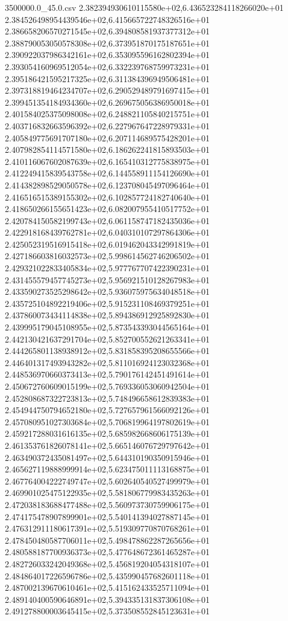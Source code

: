 \begin{filecontents*}{3500000.0_45.0.csv}
2.382394930610115580e+02,6.436523284118266020e+01
2.384526498954439546e+02,6.415665722748326516e+01
2.386658206570271545e+02,6.394808581937377312e+01
2.388790053050578308e+02,6.373951870175187651e+01
2.390922037986342161e+02,6.353095596162802394e+01
2.393054160969512054e+02,6.332239768759973231e+01
2.395186421595217325e+02,6.311384396949506481e+01
2.397318819464234707e+02,6.290529489791697415e+01
2.399451354184934360e+02,6.269675056386950018e+01
2.401584025375098008e+02,6.248821105840215751e+01
2.403716832663596392e+02,6.227967647228979331e+01
2.405849775691707180e+02,6.207114689575428201e+01
2.407982854114571580e+02,6.186262241815893503e+01
2.410116067602087639e+02,6.165410312775838975e+01
2.412249415839543758e+02,6.144558911154126690e+01
2.414382898529050578e+02,6.123708045497096464e+01
2.416516515389155302e+02,6.102857724182740640e+01
2.418650266155651423e+02,6.082007955410517752e+01
2.420784150582199743e+02,6.061158747182435036e+01
2.422918168439762781e+02,6.040310107297864306e+01
2.425052319516915418e+02,6.019462043342991819e+01
2.427186603816032573e+02,5.998614562746206502e+01
2.429321022833405834e+02,5.977767707422390231e+01
2.431455579457745273e+02,5.956921510128267983e+01
2.433590273525298642e+02,5.936075975634048518e+01
2.435725104892219406e+02,5.915231108469379251e+01
2.437860073434114838e+02,5.894386912925892830e+01
2.439995179045108955e+02,5.873543393044565164e+01
2.442130421637291704e+02,5.852700552621263341e+01
2.444265801138938912e+02,5.831858395208655566e+01
2.446401317493943282e+02,5.811016924123032368e+01
2.448536970660373413e+02,5.790176142451491614e+01
2.450672760609015199e+02,5.769336053060942504e+01
2.452808687322723813e+02,5.748496658612839383e+01
2.454944750794652180e+02,5.727657961566092126e+01
2.457080951027303684e+02,5.706819964197802619e+01
2.459217288031616135e+02,5.685982668606175139e+01
2.461353761826078141e+02,5.665146076729797642e+01
2.463490372435081497e+02,5.644310190350915946e+01
2.465627119888999914e+02,5.623475011113168875e+01
2.467764004222749747e+02,5.602640540527499979e+01
2.469901025475122935e+02,5.581806779983435263e+01
2.472038183688477488e+02,5.560973730759906175e+01
2.474175478907899901e+02,5.540141394027887145e+01
2.476312911180617391e+02,5.519309770870768261e+01
2.478450480587706011e+02,5.498478862287265656e+01
2.480588187700936373e+02,5.477648672361465287e+01
2.482726033242049368e+02,5.456819204054318107e+01
2.484864017226596786e+02,5.435990457682601118e+01
2.487002139670610461e+02,5.415162433525711094e+01
2.489140400590646891e+02,5.394335131837306108e+01
2.491278800003645415e+02,5.373508552845123631e+01

\end{filecontents*}
